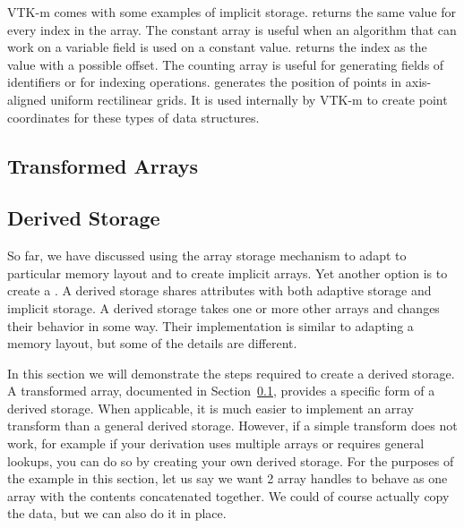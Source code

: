 
VTK-m comes with some examples of implicit storage.
 returns the same value for every index in
the array. The constant array is useful when an algorithm that can work on
a variable field is used on a constant value.
 returns the index as the value with a
possible offset. The counting array is useful for generating fields of
identifiers or for indexing operations.
 generates the position of
points in axis-aligned uniform rectilinear grids. It is used internally by
VTK-m to create point coordinates for these types of data structures.


\subsection{Transformed Arrays}
\label{sec:TransformedArrays}




\subsection{Derived Storage}


So far, we have discussed using the array storage mechanism to adapt to
particular memory layout and to create implicit arrays. Yet another option
is to create a . A derived storage shares
attributes with both adaptive storage and implicit storage. A derived
storage takes one or more other arrays and changes their behavior in some
way. Their implementation is similar to adapting a memory layout, but some
of the details are different.

In this section we will demonstrate the steps required to create a derived
storage. A transformed array, documented in
Section~\ref{sec:TransformedArrays}, provides a specific form of a derived
storage. When applicable, it is much easier to implement an array
transform than a general derived storage. However, if a simple transform
does not work, for example if your derivation uses multiple arrays or
requires general lookups, you can do so by creating your own derived
storage.  For the purposes of the example in this section, let us say we
want 2 array handles to behave as one array with the contents concatenated
together. We could of course actually copy the data, but we can also do it
in place.

